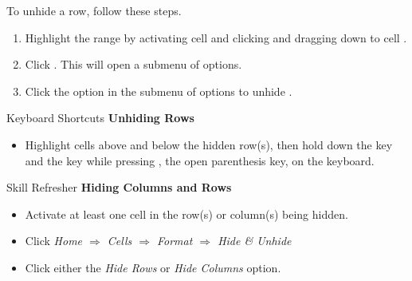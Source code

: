 To unhide a row, follow these steps.

\begin{enumerate}
	\item Highlight the range  by activating cell  and clicking and dragging down to cell .
	\item Click . This will open a submenu of options.
	\item Click the  option in the submenu of options to unhide .
\end{enumerate}

\begin{center}
	\begin{shtcutbox}{Keyboard Shortcuts}
		\textbf{Unhiding Rows}
		\\
		\begin{itemize}
			\setlength{\itemsep}{0pt}
			\setlength{\parskip}{0pt}
			\setlength{\parsep}{0pt}
			
			\item Highlight cells above and below the hidden row(s), then hold down the  key and the  key while pressing \fmtKeystroke{(}, the open parenthesis key, on the keyboard.
			
		\end{itemize}
	\end{shtcutbox}
\end{center}

\begin{center}
	\begin{sklbox}{Skill Refresher}
		\textbf{Hiding Columns and Rows}
		\\
		\begin{itemize}
			\setlength{\itemsep}{0pt}
			\setlength{\parskip}{0pt}
			\setlength{\parsep}{0pt}
			
			\item Activate at least one cell in the row(s) or column(s) being hidden.
			\item Click \textit{Home $ \Rightarrow $ Cells $ \Rightarrow $ Format $ \Rightarrow $ Hide \& Unhide}
			\item Click either the \textit{Hide Rows} or \textit{Hide Columns} option.
			
		\end{itemize}
	\end{sklbox}
\end{center}


